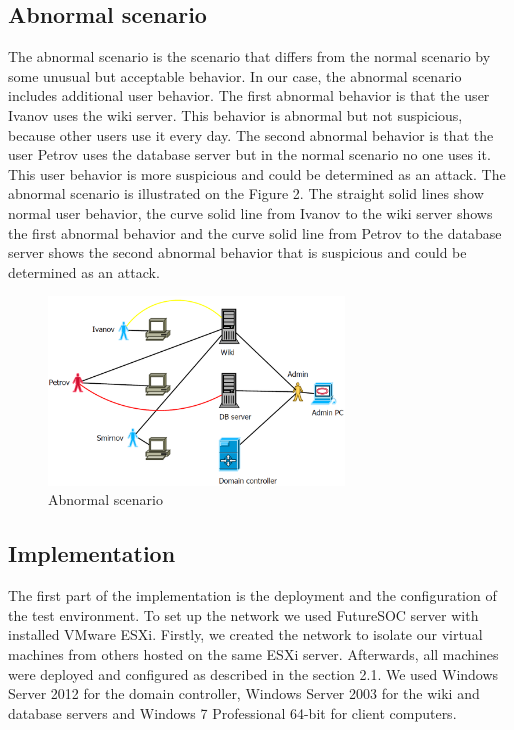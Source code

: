 \subsection{Abnormal scenario}
The abnormal scenario is the scenario that differs from the normal scenario by some unusual but acceptable behavior. In our case, the abnormal scenario includes additional user behavior. The first abnormal behavior is that the user Ivanov uses the wiki server. This behavior is abnormal but not suspicious, because other users use it every day. The second abnormal behavior is that the user Petrov uses the database server but in the normal scenario no one uses it. This user behavior is more suspicious and could be determined as an attack. The abnormal scenario is illustrated on the Figure 2. The straight solid lines show normal user behavior, the curve solid line from Ivanov to the wiki server shows the first abnormal behavior and the curve solid line from Petrov to the database server shows the second abnormal behavior that is suspicious and could be determined as an attack. 
\begin{figure}[ht!]
\centering
\includegraphics[width=0.7\textwidth]{scenario_abnormal.png}
\caption{Abnormal scenario}
\label{overflow}
\end{figure}

\subsection{Implementation}
The first part of the implementation is the deployment and the configuration of the test environment. To set up the network we used FutureSOC server with installed VMware ESXi. Firstly, we created the network to isolate our virtual machines from others hosted on the same ESXi server. Afterwards, all machines were deployed and configured as described in the section 2.1. We used Windows Server 2012 for the domain controller, Windows Server 2003 for the wiki and database servers and Windows 7 Professional 64-bit for client computers. 

